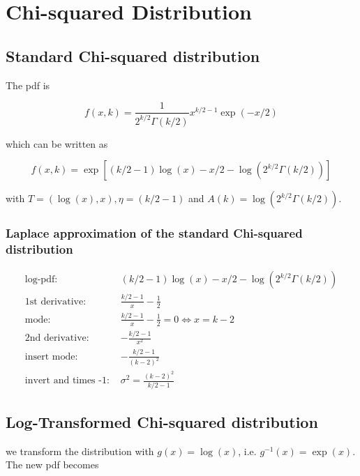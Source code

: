 \section{Chi-squared Distribution}


\subsection{Standard Chi-squared distribution}

The pdf is

\begin{equation}
	f(x, k) = \frac{1}{2^{k/2}\Gamma(k/2)}  x^{k/2 -1} \exp(-x/2)
	\label{eq:chi2_pdf}
\end{equation} 

which can be written as

\begin{equation}
	f(x, k) = \exp \left[(k/2-1)\log(x) - x/2 - \log(2^{k/2}\Gamma(k/2))\right]
	\label{eq:chi2_exp_family}
\end{equation}

with $T = (\log(x), x), \eta = (k/2 - 1)$ and $A(k) = \log(2^{k/2}\Gamma(k/2))$.

\subsubsection{Laplace approximation of the standard Chi-squared distribution}

\begin{align*}
\text{log-pdf: } &(k/2-1)\log(x) - x/2 - \log(2^{k/2}\Gamma(k/2)) \\
\text{1st derivative: }&  \frac{k/2-1}{x} - \frac{1}{2} \\
\text{mode: }&  \frac{k/2-1}{x} - \frac{1}{2} = 0 \Leftrightarrow x = k-2\\
\text{2nd derivative: }&  -\frac{k/2-1}{x^2}\\
\text{insert mode: }& -\frac{k/2-1}{(k-2)^2}\\
\text{invert and times -1: }&\sigma^2 = \frac{(k-2)^2}{k/2 -1}
\end{align*}

\subsection{Log-Transformed Chi-squared distribution}

we transform the distribution with $g(x) = \log(x)$, i.e. $g^{-1}(x) = \exp(x)$. The new pdf becomes

